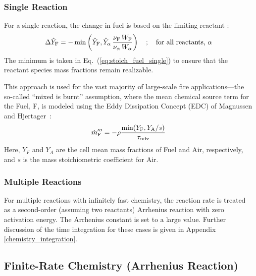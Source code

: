 \subsubsection{Single Reaction}

For a single reaction, the change in fuel is based on the limiting reactant \cite{Poinsot:TNC}:
\begin{equation}\label{eq:stoich_fuel_single}
\Delta \hat{Y}_{\rm F} = -\min \left( \hat{Y}_{\rm F}, \hat{Y}_{\alpha} \,\frac{\nu_{\rm F}\,W_{\rm F}}{\nu_{\alpha}\,W_{\alpha}}\right) \quad ; \quad \mbox{for all reactants, $\alpha$}
\end{equation}
The minimum is taken in Eq.~(\ref{eq:stoich_fuel_single}) to ensure that the reactant species mass fractions remain realizable.

This approach is used for the vast majority of large-scale fire applications---the so-called ``mixed is burnt'' assumption, where the mean chemical source term for the Fuel, F, is modeled using the Eddy Dissipation Concept (EDC) of Magnussen and Hjertager~\cite{Magnussen:1,Poinsot:TNC}:
\begin{equation}
\label{eq:edc}
\dot{m}_{\si{F}}^{\prime\prime\prime} = -\rho \frac{\min(Y_{\si{F}}, Y_{\si{A}}/s)}{\tau_{\rm mix}}
\end{equation}
Here, $Y_{\si{F}}$ and $Y_{\si{A}}$ are the cell mean mass fractions of Fuel and Air, respectively, and $s$ is the mass stoichiometric coefficient for Air.

\subsubsection{Multiple Reactions}
For multiple reactions with infinitely fast chemistry, the reaction rate is treated as a second-order (assuming two reactants) Arrhenius reaction with zero activation energy.  The Arrhenius constant is set to a large value.  Further discussion of the time integration for these cases is given in Appendix \ref{chemistry_integration}.


\subsection{Finite-Rate Chemistry (Arrhenius Reaction)}
\label{Reaction_Rate_Model}

